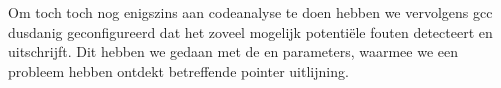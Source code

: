 Om toch toch nog enigszins aan codeanalyse te doen hebben we vervolgens \ac{gcc} dusdanig geconfigureerd dat het zoveel mogelijk potentiële fouten detecteert en uitschrijft. Dit hebben we gedaan met de  en  parameters, waarmee we een probleem hebben ontdekt betreffende pointer uitlijning.
 